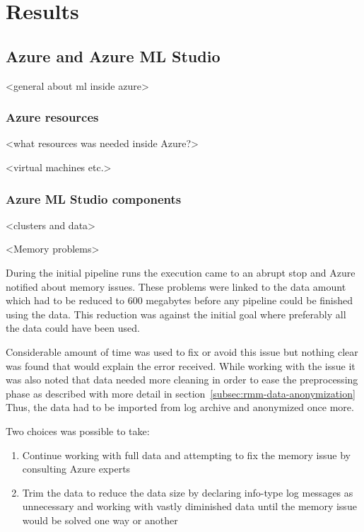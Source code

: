 

\section{Results}\label{sec:results}


\subsection{Azure and Azure ML Studio}\label{subsec:azure-and-azure-ml-studio}

<general about ml inside azure>

\subsubsection*{Azure resources}

<what resources was needed inside Azure?>

<virtual machines etc.>




\subsubsection*{Azure ML Studio components}
<clusters and data>

<Memory problems>

During the initial pipeline runs
the execution came to an abrupt stop
and Azure notified about memory issues.
These problems were linked to the data amount
which had to be reduced to 600 megabytes
before any pipeline could be finished using the data.
This reduction was against the initial goal
where preferably all the data could have been used.

Considerable amount of time was used
to fix or avoid this issue
but nothing clear was found
that would explain the error received.
While working with the issue
it was also noted
that data needed more cleaning
in order to ease the preprocessing phase
as described with more detail in section~\ref{subsec:rmm-data-anonymization}
Thus,
the data had to be imported from log archive
and anonymized once more.

Two choices was possible to take:
\begin{enumerate}
    \item Continue working with full data
    and attempting to fix the memory issue
    by consulting Azure experts
    \item  Trim the data to reduce the data size
    by declaring info-type log messages
    as unnecessary
    and working with vastly diminished data
    until the memory issue would be solved
    one way or another
\end{enumerate}

